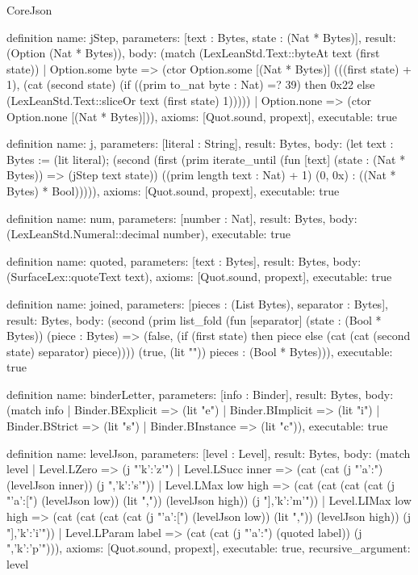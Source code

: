 \begin{lexlean}{CoreJson}
\begin{semanticmodule}
definition{
  name: jStep,
  parameters: [text : Bytes, state : (Nat * Bytes)],
  result: (Option (Nat * Bytes)),
  body: (match (LexLeanStd.Text::byteAt text (first state))
    | Option.some byte => (ctor Option.some [(Nat * Bytes)] (((first state) + 1), (cat (second state) (if ((prim to_nat byte : Nat) =? 39) then 0x22 else (LexLeanStd.Text::sliceOr text (first state) 1)))))
    | Option.none => (ctor Option.none [(Nat * Bytes)])),
  axioms: [Quot.sound, propext],
  executable: true
}

definition{
  name: j,
  parameters: [literal : String],
  result: Bytes,
  body: (let text : Bytes := (lit literal); (second (first (prim iterate_until (fun [text] (state : (Nat * Bytes)) => (jStep text state)) ((prim length text : Nat) + 1) (0, 0x) : ((Nat * Bytes) * Bool))))),
  axioms: [Quot.sound, propext],
  executable: true
}

definition{
  name: num,
  parameters: [number : Nat],
  result: Bytes,
  body: (LexLeanStd.Numeral::decimal number),
  executable: true
}

definition{
  name: quoted,
  parameters: [text : Bytes],
  result: Bytes,
  body: (SurfaceLex::quoteText text),
  axioms: [Quot.sound, propext],
  executable: true
}

definition{
  name: joined,
  parameters: [pieces : (List Bytes), separator : Bytes],
  result: Bytes,
  body: (second (prim list_fold (fun [separator] (state : (Bool * Bytes)) (piece : Bytes) => (false, (if (first state) then piece else (cat (cat (second state) separator) piece)))) (true, (lit "")) pieces : (Bool * Bytes))),
  executable: true
}

definition{
  name: binderLetter,
  parameters: [info : Binder],
  result: Bytes,
  body: (match info
    | Binder.BExplicit => (lit "e")
    | Binder.BImplicit => (lit "i")
    | Binder.BStrict => (lit "s")
    | Binder.BInstance => (lit "c")),
  executable: true
}

definition{
  name: levelJson,
  parameters: [level : Level],
  result: Bytes,
  body: (match level
    | Level.LZero => (j "{'k':'z'}")
    | Level.LSucc inner => (cat (cat (j "{'a':") (levelJson inner)) (j ",'k':'s'}"))
    | Level.LMax low high => (cat (cat (cat (cat (j "{'a':[") (levelJson low)) (lit ",")) (levelJson high)) (j "],'k':'m'}"))
    | Level.LIMax low high => (cat (cat (cat (cat (j "{'a':[") (levelJson low)) (lit ",")) (levelJson high)) (j "],'k':'i'}"))
    | Level.LParam label => (cat (cat (j "{'a':") (quoted label)) (j ",'k':'p'}"))),
  axioms: [Quot.sound, propext],
  executable: true,
  recursive_argument: level
}


\end{semanticmodule}
\end{lexlean}
